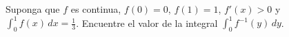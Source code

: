 \item Suponga que $f$ es continua, $f(0) = 0$, $f(1) = 1$, $f'(x) > 0$ y $\int_{0}^{1} f(x) \, dx = \frac{1}{3}$. Encuentre el valor de la integral $\int_{0}^{1} f^{-1}(y) \, dy$.
